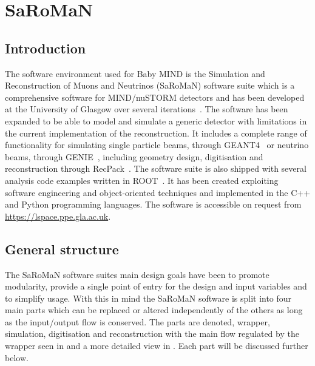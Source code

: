 \chapter{SaRoMaN}
\label{c:software}

\section{Introduction}

The software environment used for Baby MIND is the Simulation and Reconstruction of Muons and Neutrinos (SaRoMaN) software suite which is a comprehensive software for MIND/nuSTORM detectors and has been developed at the University of Glasgow over several iterations~\cite{27Bross,  53Laing, 54NUFACT2016Hallsjo}. The software has been expanded to be able to model and simulate a generic detector with limitations in the current implementation of the reconstruction. It includes a complete range of functionality for simulating single particle beams, through GEANT4~\cite{Geant4} or neutrino beams, through GENIE~\cite{Genie}, including geometry design, digitisation and reconstruction through RecPack~\cite{RecPack}. The software suite is also shipped with several analysis code examples written in ROOT~\cite{Root}. It has been created exploiting software engineering and object-oriented techniques and implemented in the C++ and Python programming languages. The software is accessible on request from \url{https://lspace.ppe.gla.ac.uk}. 

\section{General structure}
The SaRoMaN software suites main design goals have been to promote modularity, provide a single point of entry for the design and input variables and to simplify usage. With this in mind the SaRoMaN software is split into four main parts which can be replaced or altered independently of the others as long as the input/output flow is conserved. The parts are denoted, wrapper, simulation, digitisation and reconstruction with the main flow regulated by the wrapper seen in  and a more detailed view in . Each part will be discussed further below.

